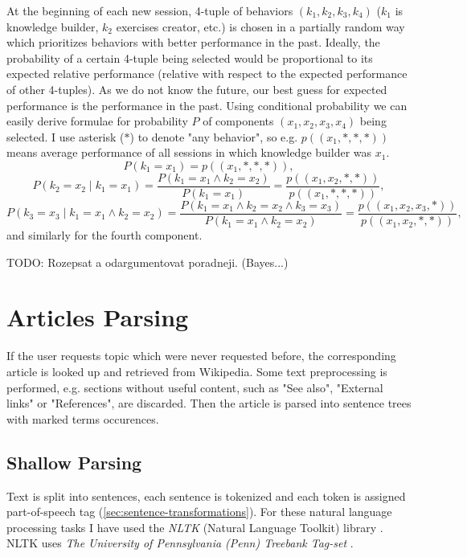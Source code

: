 \documentclass[a4paper, 12pt, twoside]{fithesis2}		%
\renewcommand{\_}{\leavevmode \kern0.07em\vbox{\hrule width0.4em}}
\begin{document}
At the beginning of each new session, 4-tuple of behaviors $(k_1, k_2, k_3, k_4)$ ($k_1$ is knowledge builder, $k_2$ exercises creator, etc.) is chosen in a partially random way
which prioritizes behaviors with better performance in the past.
Ideally, the probability of a certain 4-tuple being selected would be proportional to its expected relative performance
(relative with respect to the expected performance of other 4-tuples).
As we do not know the future, our best guess for expected performance is the performance in the past.
Using conditional probability we can easily derive formulae for probability $P$ of components $(x_1, x_2, x_3, x_4)$ being selected.
I use asterisk ($*$) to denote "any behavior", so e.g. $p((x_1, *, *, *))$ means average performance of all sessions in which knowledge builder was $x_1$.
$$
P(k_1 = x_1) = p((x_1, *, *, *)),
$$
$$
P(k_2 = x_2 \mid k_1 = x_1)
  = \frac{P(k_1 = x_1 \land k_2 = x_2)}{P(k_1 = x_1)}
  = \frac{p((x_1, x_2, *, *))}{p((x_1, *, *, *))},
$$
$$
P(k_3 = x_3 \mid k_1 = x_1 \land k_2 = x_2)
  = \frac{P(k_1 = x_1 \land k_2 = x_2 \land k_3 = x_3)}{P(k_1 = x_1 \land k_2 = x_2)}
  = \frac{p((x_1, x_2, x_3, *))}{p((x_1, x_2, *, *))},
$$
and similarly for the fourth component.



TODO: Rozepsat a odargumentovat poradneji. (Bayes...)


\section{Articles Parsing}
\label{sec:articles-parsing}

If the user requests topic which were never requested before,
the corresponding article is looked up and retrieved from Wikipedia.
Some text preprocessing is performed, e.g. sections without useful content, such as "See also", "External links" or "References", are discarded.
Then the article is parsed into sentence trees with marked terms occurences.

\subsection*{Shallow Parsing}
Text is split into sentences, each sentence is tokenized
and each token is assigned part-of-speech tag (\autoref{sec:sentence-transformations}).
    For these natural language processing tasks I have used the \textit{NLTK} (Natural Language Toolkit) library \cite{nlp-python}. NLTK uses \textit{The University of Pennsylvania (Penn) Treebank Tag-set} \cite{penn-tagset}.
\end{document}
